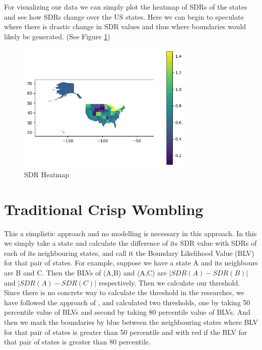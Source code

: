 \documentclass[enabledeprecatedfontcommands,parskip=half,twoside=semi,BCOR=0mm]{scrreprt}
\numberwithin{equation}{chapter}
\theoremstyle{definition}
\theoremstyle{remark}
\begin{document}
    For visualizing our data we can simply plot the heatmap of SDRs of the states and see how SDRs change over the US states. Here we can begin to speculate where there is drastic change in SDR values and thus where boundaries would likely be generated. (See Figure \ref{fig:Figure 2})
    \begin{figure}[h]
    \centering
    \includegraphics[width=0.75\textwidth]{SDR.png}
    \caption{SDR Heatmap}
    \label{fig:Figure 2}
    \end{figure}
    
    \section{Traditional Crisp Wombling}
    
    This a simplistic approach and no modelling is necessary in this approach. In this we simply take a state and calculate the difference of its SDR value with SDRs of each of its neighbouring states, and call it the Boundary Likelihood Value (BLV) for that pair of states. For example, suppose we have a state A and its neighbours are B and C. Then the BLVs of (A,B) and (A,C) are \(|SDR(A)-SDR(B)|\) and \(|SDR(A)-SDR(C)|\) respectively. Then we calculate our threshold. Since there is no concrete way to calculate the threshold in the researches, we have followed the approach of \cite{Lu_Carlin.2005}, and calculated two thresholds, one by taking 50 percentile value of BLVs and second by taking 80 percentile value of BLVs. And then we mark the boundaries by blue between the neighbouring states where BLV for that pair of states is greater than 50 percentile and with red if the BLV for that pair of states is greater than 80 percentile.
\end{document}
